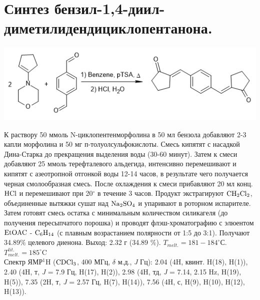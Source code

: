 \documentclass[a4paper]{article}
\begin{document}
\section{Синтез бензил-1,4-диил-диметилидендициклопентанона.}
\begin{center}
\includegraphics[scale=0.45]{pictures/4.png}
\end{center}
К раствору 50 ммоль N-циклопентенморфолина в 50 мл бензола добавляют 2-3 капли морфолина и 50 мг п-толуолсульфокислоты. Смесь кипятят с насадкой Дина-Старка до прекращения выделения воды (30-60 минут). Затем к смеси добавляют 25 ммоль терефталевого альдегида, интенсивно перемешивают и кипятят с азеотропной отгонкой воды 12-14 часов, в результате чего получается черная смолообразная смесь. После охлаждения к смеси прибавляют 20 мл конц. $\ce{HCl}$ и перемешивают при 20$^{\circ}$ в течение 3 часов. Продукт экстрагируют $\ce{CH2Cl2}$, объединенные вытяжки сушат над $\ce{Na2SO4}$ и упаривают в роторном испарителе. Затем готовят смесь остатка с минимальным количеством силикагеля (до получения пересыпчатого порошка) и проводят флэш-хроматографию с элюентом $\ce{EtOAC}$ - $\ce{C6H14}$ (с плавным возрастанием полярности от 1:5 до 3:1). Получают 34.89$\%$ целевого диенона. Выход: 2.32 г (34.89 $\%$).
$T_{melt.} = 181-184^{\circ}$С. $T_{melt.}^{lit.} = 185^{\circ}$C \cite{dimmock2002} \\
Спектр ЯМР$^{1}$H ($\ce{CDCl3}$, 400 МГц, $\delta$ м.д., \textit{J} Гц): 2.04 (4H, квинт. H(18), H(1)), 2.40 (4H, т, \textit{J} = 7.9 Гц, H(17), H(2)), 2.98 (4H, тд, \textit{J} = 7.14, 2.15 Hz, H(19), H(5)), 7.35 (2H, т, \textit{J} = 2.57 Гц, H(7), H(14)), 7.56 (4H, с, H(9), H(10), H(12), H(13)).



\end{document}
